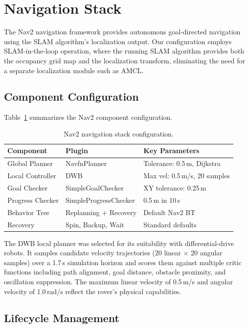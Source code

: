 \section{Navigation Stack}

The Nav2 navigation framework provides autonomous goal-directed navigation using the SLAM algorithm's localization output. Our configuration employs SLAM-in-the-loop operation, where the running SLAM algorithm provides both the occupancy grid map and the localization transform, eliminating the need for a separate localization module such as AMCL.

\subsection{Component Configuration}

Table~\ref{tab:nav2_config} summarizes the Nav2 component configuration.

\begin{table}[htbp]
\centering
\caption{Nav2 navigation stack configuration.}
\label{tab:nav2_config}
\begin{tabular}{lll}
\toprule
\textbf{Component} & \textbf{Plugin} & \textbf{Key Parameters} \\
\midrule
Global Planner & NavfnPlanner & Tolerance: 0.5\,m, Dijkstra \\
Local Controller & DWB & Max vel: 0.5\,m/s, 20 samples \\
Goal Checker & SimpleGoalChecker & XY tolerance: 0.25\,m \\
Progress Checker & SimpleProgressChecker & 0.5\,m in 10\,s \\
Behavior Tree & Replanning + Recovery & Default Nav2 BT \\
Recovery & Spin, Backup, Wait & Standard defaults \\
\bottomrule
\end{tabular}
\end{table}

The DWB local planner was selected for its suitability with differential-drive robots. It samples candidate velocity trajectories (20 linear $\times$ 20 angular samples) over a 1.7\,s simulation horizon and scores them against multiple critic functions including path alignment, goal distance, obstacle proximity, and oscillation suppression. The maximum linear velocity of 0.5\,m/s and angular velocity of 1.0\,rad/s reflect the rover's physical capabilities.

\subsection{Lifecycle Management}

